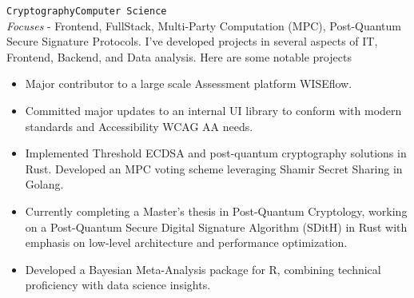 \documentclass[9pt]{developercv} %
\begin{document}
\begin{minipage}[t]{0.4\textwidth} %
	\vspace{-\baselineskip}


	\begin{barchart}{5} %
	\end{barchart}
\end{minipage} %
\hfill %
\begin{minipage}[t]{0.53\textwidth} %
	\vspace{-\baselineskip}


	\begin{barchart}{5} %
	\end{barchart}
\end{minipage}


\vspace{-5px}
\texttt{Cryptography}\slashsep\texttt{Computer Science}\\

\textit{Focuses} - Frontend, FullStack, Multi-Party Computation (MPC), Post-Quantum Secure Signature Protocols. I’ve developed projects  in several aspects of IT, Frontend, Backend, and Data analysis. Here are some notable projects

\begin{itemize}
	\item Major contributor to a large scale Assessment platform WISEflow.
	\item Committed major updates to an internal UI library to conform with modern standards and Accessibility WCAG AA needs.
	\item Implemented Threshold ECDSA and post-quantum cryptography solutions in Rust. Developed an MPC voting scheme leveraging Shamir Secret Sharing in Golang.
	\item Currently completing a Master’s thesis in Post-Quantum Cryptology, working on a Post-Quantum Secure Digital Signature Algorithm (SDitH) in Rust with emphasis on low-level architecture and performance optimization.
	\item Developed a Bayesian Meta-Analysis package for R, combining technical proficiency with data science insights.
\end{itemize}
\end{document}
